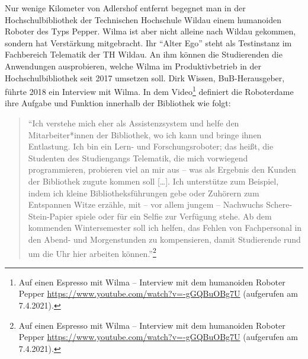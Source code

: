 \documentclass[a4paper,
fontsize=11pt,
oneside,
numbers=noperiodatend,
parskip=half-,
bibliography=totoc,
final
]{scrartcl}
\begin{document}
Nur wenige Kilometer von Adlershof entfernt begegnet man in der
Hochschulbibliothek der Technischen Hochschule Wildau einem humanoiden
Roboter des Typs Pepper. Wilma ist aber nicht alleine nach Wildau
gekommen, sondern hat Verstärkung mitgebracht. Ihr \enquote{Alter Ego}
steht als Testinstanz im Fachbereich Telematik der TH Wildau. An ihm
können die Studierenden die Anwendungen ausprobieren, welche Wilma im
Produktivbetrieb in der Hochschulbibliothek seit 2017 umsetzen soll.
Dirk Wissen, BuB-Herausgeber, führte 2018 ein Interview mit Wilma. In
dem Video\footnote{Auf einen Espresso mit Wilma -- Interview mit dem
  humanoiden Roboter Pepper
  \url{https://www.youtube.com/watch?v=-gGQBuOBg7U} (aufgerufen am
  7.4.2021).} definiert die Roboterdame ihre Aufgabe und Funktion
innerhalb der Bibliothek wie folgt:

\begin{quote}
\enquote{Ich verstehe mich eher als Assistenzsystem und helfe den
Mitarbeiter*innen der Bibliothek, wo ich kann und bringe ihnen
Entlastung. Ich bin ein Lern- und Forschungsroboter; das heißt, die
Studenten des Studiengangs Telematik, die mich vorwiegend programmieren,
probieren viel an mir aus -- was als Ergebnis den Kunden der Bibliothek
zugute kommen soll {[}\ldots{]}. Ich unterstütze zum Beispiel, indem ich
kleine Bibliotheksführungen gebe oder Zuhörern zum Entspannen Witze
erzähle, mit -- vor allem jungem -- Nachwuchs Schere-Stein-Papier spiele
oder für ein Selfie zur Verfügung stehe. Ab dem kommenden Wintersemester
soll ich helfen, das Fehlen von Fachpersonal in den Abend- und
Morgenstunden zu kompensieren, damit Studierende rund um die Uhr hier
arbeiten können.}\footnote{Auf einen Espresso mit Wilma -- Interview
  mit dem humanoiden Roboter Pepper
  \url{https://www.youtube.com/watch?v=-gGQBuOBg7U} (aufgerufen am
  7.4.2021).}
\end{quote}
\end{document}
